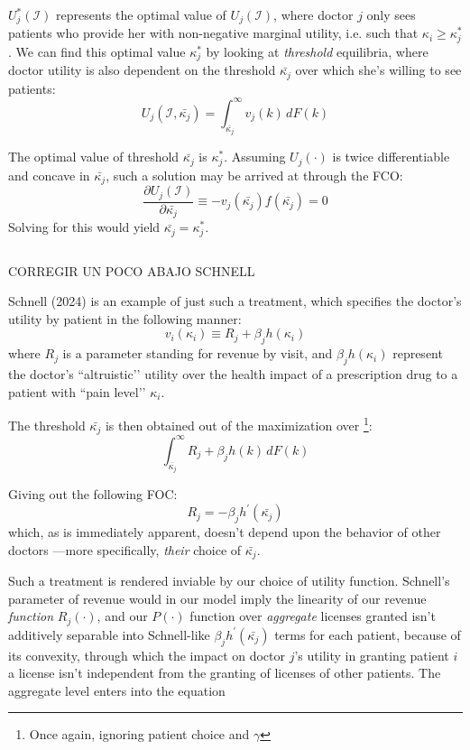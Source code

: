 \documentclass{article}
\begin{document}
$U_j^*(\mathcal{I})$ represents the optimal value of $U_j(\mathcal{I})$, where doctor $j$ only sees patients who provide her with non-negative marginal utility, i.e. such that $\kappa_i \geq \kappa_j^*$. We can find this optimal value $\kappa_j^*$ by looking at \textit{threshold} equilibria, where doctor utility is also dependent on the threshold $\bar{\kappa_j}$ over which she’s willing to see patients:
\[
U_j(\mathcal{I}, \bar{\kappa_j}) =\int_{\bar{\kappa_j}}^{\infty} v_{j}(k) \, dF(k)
\]

The optimal value of threshold $\bar{\kappa_j}$ is $\kappa_j^*$. Assuming $U_j(\cdot) $ is twice differentiable and concave in $\bar{\kappa_j}$, such a solution may be arrived at through the FCO:
\[
\frac{\partial U_j(\mathcal{I})}{\partial \bar{\kappa_j}} \equiv - v_{j}(\bar{\kappa_j})f(\bar{\kappa_j}) = 0
\]
Solving for this would yield $\bar{\kappa_j} = \kappa_j^*$.

\[\]

CORREGIR UN POCO ABAJO SCHNELL

Schnell (2024) is an example of just such a treatment, which specifies the doctor’s utility by patient in the following manner:
\[
v_i(\kappa_i) \equiv R_j + \beta_j h(\kappa_i)
\]
where $R_j$ is a parameter standing for revenue by visit, and $\beta_j h(\kappa_i)$ represent the doctor’s ``altruistic’’ utility over the health impact of a prescription drug to a patient with ``pain level’’ $\kappa_i$.

The threshold $\bar{\kappa_j}$ is then obtained out of the maximization over \footnote{Once again, ignoring patient choice and $\gamma$}:
\[
\int_{\bar{\kappa_j}}^{\infty}  R_j + \beta_j h(k) \, dF(k)
\]

Giving out the following FOC:
\[
R_j = - \beta_j h^{\prime}(\bar{\kappa_j})
\]
which, as is immediately apparent, doesn’t depend upon the behavior of other doctors ---more specifically, \textit{their} choice of $\bar{\kappa_j}$.

Such a treatment is rendered inviable by our choice of utility function. Schnell’s parameter of revenue would in our model imply the linearity of our revenue \textit{function} $R_j(\cdot)$, and our $P(\cdot)$ function over \textit{aggregate} licenses granted isn’t additively separable into Schnell-like $\beta_j h^{\prime}(\bar{\kappa_j})$ terms for each patient, because of its convexity, through which the impact on doctor $j$’s utility in granting patient $i$ a license isn’t independent from the granting of licenses of other patients. The aggregate level enters into the equation
\end{document}
